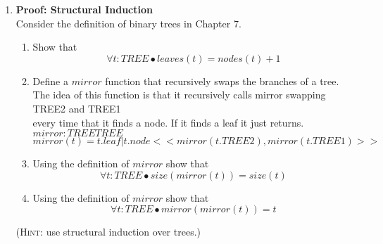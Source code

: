 \documentclass{article}
\begin{document}
\begin{enumerate}[\bf I.]
\item \textbf{Proof: Structural Induction} \\[8pt]
Consider the definition of binary trees in Chapter 7.
\begin{enumerate}
\item Show that
\[\forall t: TREE \bullet leaves(t) = nodes(t) + 1\]
\item Define a $mirror$ function that recursively swaps the branches of a tree. \\
  The idea of this function is that it recursively calls mirror swapping TREE2 and TREE1 \\
  every time that it finds a node. If it finds a leaf it just returns. \\
  $ mirror: TREE $\arrowright$ TREE $\\
$mirror(t) = t.leaf | t.node <<mirror(t.TREE2),mirror(t.TREE1)>>$ \\
\item Using the definition of $mirror$  show
that
\[\forall t: TREE \bullet size(mirror(t)) = size(t)\]
\item Using the definition of $mirror$ show that
\[\forall t: TREE \bullet mirror(mirror(t)) = t\]
\end{enumerate}
(\textsc{Hint}: use structural induction over trees.)


\end{enumerate}
\end{document}
